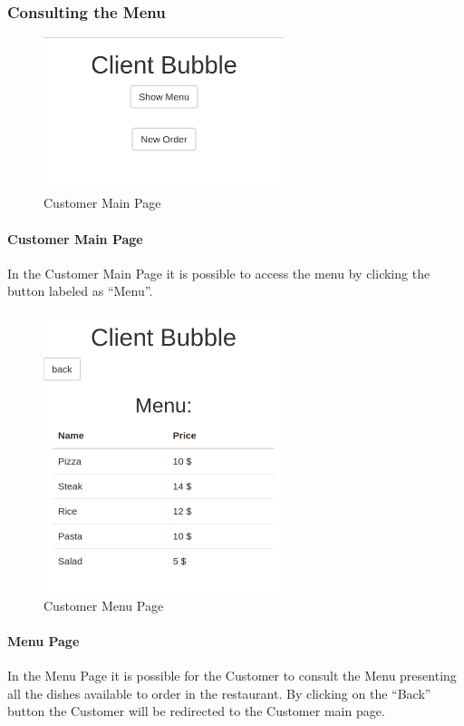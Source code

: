 \subsubsection{Consulting the Menu}
\begin{figure}[H]
	\centering
	\includegraphics[width=7cm]{../../documenti/UserManualDemo/demo_screens/client_main.png}
	\caption{Customer Main Page}
\end{figure}
\paragraph{Customer Main Page}
In the Customer Main Page it is possible to access the menu by clicking the button labeled as ``Menu''.
\begin{figure}[H]
	\centering
	\includegraphics[width=7cm]{../../documenti/UserManualDemo/demo_screens/client_menu.png}
	\caption{Customer Menu Page}
\end{figure}
\paragraph{Menu Page }
In the Menu Page it is possible for the Customer to consult the Menu presenting all the dishes available to order in the restaurant.
By clicking on the ``Back'' button the Customer will be redirected to the Customer main page.

